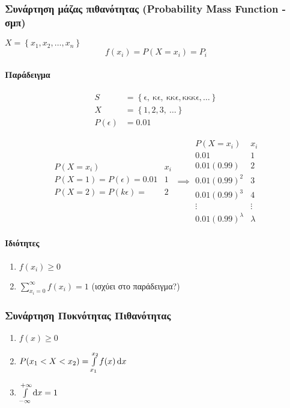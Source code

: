 \documentclass[11pt,a4paper,titlepage,draft]{article}
\newcommand{\textlatin}[1]{#1}
\begin{document}
\subsubsection{Συνάρτηση μάζας πιθανότητας (\textlatin{Probability Mass Function} - σμπ)}
\(
X =  \left\lbrace x_1,x_2,\dots,x_n \right\rbrace
\)
\[
f(x_i) = P(X=x_i) = P_i
\]

\paragraph{Παράδειγμα}
\begin{align*}
S &=  \left\lbrace \mathrm{\epsilon,\ \kappa \epsilon,\ \kappa \kappa \epsilon,\kappa \kappa \kappa \epsilon},\dots  \right\rbrace \\
X &=  \left\lbrace 1, 2, 3,\ \dots  \right\rbrace\\
P(\epsilon) &= 0.01
\end{align*}

\[
\begin{array}{r|l}
P(X=x_i) & x_i\\
\hline
P(X=1)=P(\epsilon)=0.01 & 1 \\
P(X=2)=P(k\epsilon)=\quad & 2 \\
\end{array}
\implies
\begin{array}{r|l}
P(X=x_i) & x_i\\
\hline
0.01 & 1\\
0.01(0.99) & 2 \\
0.01(0.99)^2 & 3 \\
0.01(0.99)^3 & 4 \\
\vdots & \vdots \\
0.01(0.99)^\lambda & \lambda
\end{array}
\]

\paragraph{Ιδιότητες}
\begin{enumerate}
\item \(f(x_i) \geq 0\)
\item \(\sum\limits_{x_i=0}^\infty f(x_i) = 1\) (ισχύει στο παράδειγμα?)
\end{enumerate}

\subsubsection{Συνάρτηση Πυκνότητας Πιθανότητας}
\begin{enumerate}
\item \(f(x) \geq 0\)
\item \(P(x_1 < X < x_2) = \int\limits_{x_1}^{x_2} f(x) \dif x\)
\item \(\int\limits_{-\infty}^{+\infty} \dif x = 1\)
\end{enumerate}
\end{document}

